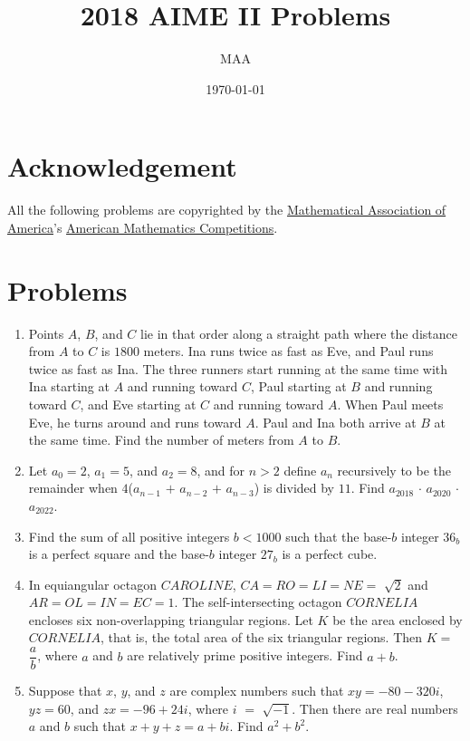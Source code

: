 \documentclass{article}%
\title{2018 AIME II Problems}%
\author{MAA}%
\date{\today}%
\begin{document}
%
\normalsize%
\maketitle%
\section{Acknowledgement}%
\label{sec:Acknowledgement}%
All the following problems are copyrighted by the \href{https://www.maa.org/}{Mathematical Association of America}'s \href{https://www.maa.org/math-competitions}{American Mathematics Competitions}.

%
\section{Problems}%
\label{sec:Problems}%
\begin{enumerate}%
\item%
[\textbf{Problem 1}]Points $A$, $B$, and $C$ lie in that order along a straight path where the distance from $A$ to $C$ is $1800$ meters. Ina runs twice as fast as Eve, and Paul runs twice as fast as Ina. The three runners start running at the same time with Ina starting at $A$ and running toward $C$, Paul starting at $B$ and running toward $C$, and Eve starting at $C$ and running toward $A$. When Paul meets Eve, he turns around and runs toward $A$. Paul and Ina both arrive at $B$ at the same time. Find the number of meters from $A$ to $B$.
%
\item%
[\textbf{Problem 2}]Let $a_{0} = 2$, $a_{1} = 5$, and $a_{2} = 8$, and for $n > 2$ define $a_{n}$ recursively to be the remainder when $4$($a_{n-1}$ $+$ $a_{n-2}$ $+$ $a_{n-3}$) is divided by $11$. Find $a_{2018}$ $\cdot$ $a_{2020}$ $\cdot$ $a_{2022}$.
%
\item%
[\textbf{Problem 3}]Find the sum of all positive integers $b < 1000$ such that the base-$b$ integer $36_{b}$ is a perfect square and the base-$b$ integer $27_{b}$ is a perfect cube.
%
\item%
[\textbf{Problem 4}]In equiangular octagon $CAROLINE$, $CA = RO = LI = NE =$ $\sqrt{2}$ and $AR = OL = IN = EC = 1$. The self-intersecting octagon $CORNELIA$ encloses six non-overlapping triangular regions. Let $K$ be the area enclosed by $CORNELIA$, that is, the total area of the six triangular regions. Then $K =$ $\dfrac{a}{b}$, where $a$ and $b$ are relatively prime positive integers. Find $a + b$.
%
\item%
[\textbf{Problem 5}]Suppose that $x$, $y$, and $z$ are complex numbers such that $xy = -80 - 320i$, $yz = 60$, and $zx = -96 + 24i$, where $i$ $=$ $\sqrt{-1}$. Then there are real numbers $a$ and $b$ such that $x + y + z = a + bi$. Find $a^2 + b^2$.

\end{enumerate}
\end{document}

